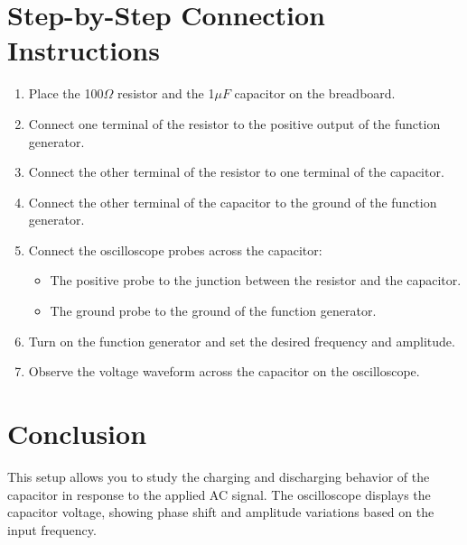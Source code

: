 \documentclass[12pt,a4paper]{report}
\begin{document}
\section*{Step-by-Step Connection Instructions}
\begin{enumerate}
    \item Place the 100\( \Omega \) resistor and the 1\( \mu F \) capacitor on the breadboard.
    \item Connect one terminal of the resistor to the positive output of the function generator.
    \item Connect the other terminal of the resistor to one terminal of the capacitor.
    \item Connect the other terminal of the capacitor to the ground of the function generator.
    \item Connect the oscilloscope probes across the capacitor:
    \begin{itemize}
        \item The positive probe to the junction between the resistor and the capacitor.
        \item The ground probe to the ground of the function generator.
    \end{itemize}
    \item Turn on the function generator and set the desired frequency and amplitude.
    \item Observe the voltage waveform across the capacitor on the oscilloscope.
\end{enumerate}

\section*{Conclusion}
This setup allows you to study the charging and discharging behavior of the capacitor in response to the applied AC signal. The oscilloscope displays the capacitor voltage, showing phase shift and amplitude variations based on the input frequency.
\end{document}
